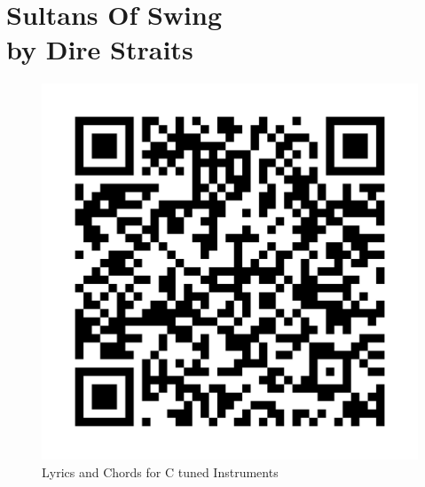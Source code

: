 \chapter[Sultans Of Swing]{Sultans Of Swing\\[1ex]\large{by Dire Straits}}


\begin{figure}
\includegraphics[width=1\linewidth]{QR_Codes/QR_SultansOfSwing_LyricsChords.png}\\
Lyrics and Chords for C tuned Instruments
\end{figure}



